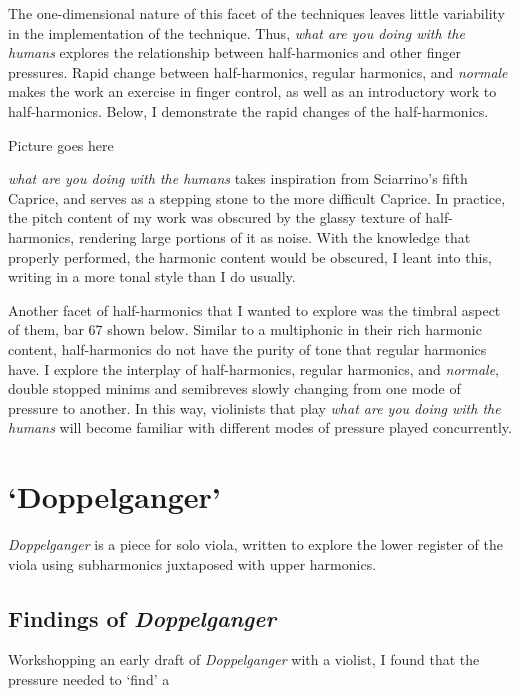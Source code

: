 The one-dimensional nature of this facet of the techniques leaves little variability in the implementation of the technique. 
Thus, \emph{what are you doing with the humans} explores the relationship between half-harmonics and other finger pressures. 
Rapid change between half-harmonics, regular harmonics, and \emph{normale} makes the work an exercise in finger control, as well as an introductory work to half-harmonics.
Below, I demonstrate the rapid changes of the half-harmonics.

Picture goes here

\emph{what are you doing with the humans} takes inspiration from Sciarrino's fifth Caprice, and serves as a stepping stone to the more difficult Caprice.\autocite[]{sciarrinoCapricciViolino1976} 
In practice, the pitch content of my work was obscured by the glassy texture of half-harmonics, rendering large portions of it as noise. 
With the knowledge that properly performed, the harmonic content would be obscured, I leant into this, writing in a more tonal style than I do usually.


Another facet of half-harmonics that I wanted to explore was the timbral aspect of them, bar 67 shown below.
Similar to a multiphonic in their rich harmonic content, half-harmonics do not have the purity of tone that regular harmonics have.
I explore the interplay of half-harmonics, regular harmonics, and \emph{normale}, double stopped minims and semibreves slowly changing from one mode of pressure to another.
In this way, violinists that play \emph{what are you doing with the humans} will become familiar with different modes of pressure played concurrently.

\section{`Doppelganger'}
\emph{Doppelganger} is a piece for solo viola, written to explore the lower register of the viola using subharmonics juxtaposed with upper harmonics. 


\subsection{Findings of \emph{Doppelganger}}
Workshopping an early draft of \emph{Doppelganger} with a violist, I found that the pressure needed to `find' a  \lipsum[3]

